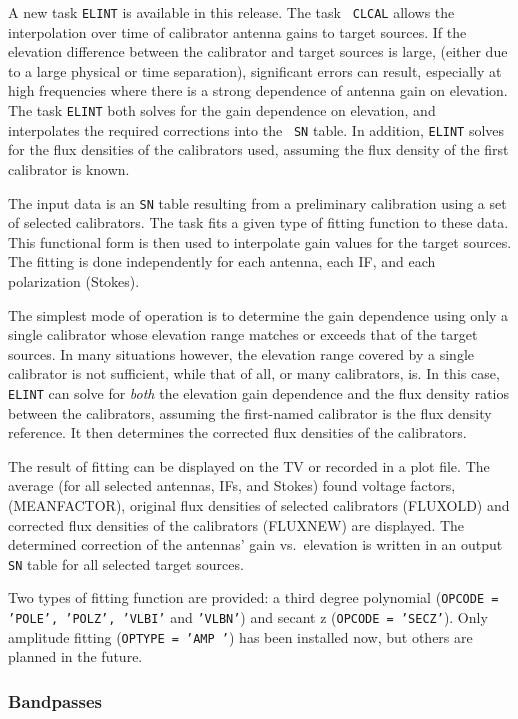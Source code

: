 A new task {\tt ELINT} is available in this release. The task {\tt
CLCAL} allows the interpolation over time of calibrator antenna gains
to target sources. If the elevation difference between the calibrator
and target sources is large, (either due to a large physical or time
separation), significant errors can result, especially at high
frequencies where there is a strong dependence of antenna gain on
elevation.  The task {\tt ELINT} both solves for the gain dependence
on elevation, and interpolates the required corrections into the {\tt
SN} table.  In addition, {\tt ELINT} solves for the flux densities of
the calibrators used, assuming the flux density of the first
calibrator is known.

The input data is an {\tt SN} table resulting from a preliminary
calibration using a set of selected calibrators. The task fits a given
type of fitting function to these data.  This functional form is then
used to interpolate gain values for the target sources. The fitting is
done independently for each antenna, each IF, and each polarization
(Stokes).

The simplest mode of operation is to determine the gain dependence
using only a single calibrator whose elevation range matches or
exceeds that of the target sources.  In many situations however, the
elevation range covered by a single calibrator is not sufficient,
while that of all, or many calibrators, is.  In this case, {\tt ELINT}
can solve for {\it both} the elevation gain dependence and the flux
density ratios between the calibrators, assuming the first-named
calibrator is the flux density reference. It then determines the
corrected flux densities of the calibrators.

The result of fitting can be displayed on the TV or recorded in a plot
file.  The average (for all selected antennas, IFs, and Stokes) found
voltage factors, (MEANFACTOR), original flux densities of selected
calibrators (FLUXOLD) and corrected flux densities of the calibrators
(FLUXNEW) are displayed.  The determined correction of the antennas'
gain vs.\ elevation is written in an output {\tt SN} table for all
selected target sources.

Two types of fitting function are provided: a third degree polynomial
({\tt OPCODE = 'POLE', 'POLZ', 'VLBI'} and {\tt 'VLBN'}) and secant z
({\tt OPCODE = 'SECZ'}).  Only amplitude fitting ({\tt OPTYPE = 'AMP
'}) has been installed now, but others are planned in the future.


\subsubsection{Bandpasses}

